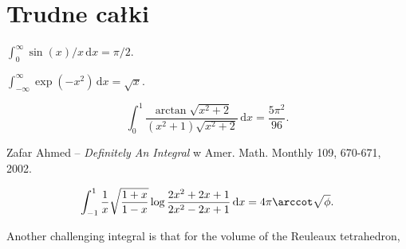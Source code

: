 \section{Trudne całki}

\begin{integral}
    $\int_0^\infty \sin(x) / x \,\mathrm{d}x = \pi/2$.
\end{integral}

\begin{integral}
    $\int_{-\infty}^\infty \exp(-x^2) \,\mathrm{d}x = \sqrt x$.
\end{integral}

\begin{integral}
    \begin{equation}
        \int_0^1 \frac{\arctan \sqrt{x^2+2}}{(x^2+1) \sqrt{x^2+2}} \,\mathrm{d}x = \frac{5\pi^2}{96}.
    \end{equation}
\end{integral}

\begin{solution}
    Zafar Ahmed -- \emph{Definitely An Integral} w Amer. Math. Monthly 109, 670-671, 2002.
\end{solution}

\begin{integral}
    \begin{equation}
        \int_{-1}^1 \frac{1}{x} \sqrt{\frac{1+x}{1-x}} \log \frac{2x^2+2x+1}{2x^2-2x+1} \,\mathrm{d}x = 4 \pi \arccot \sqrt{\phi}.
    \end{equation}
\end{integral}




Another challenging integral is that for the volume of the Reuleaux tetrahedron,

